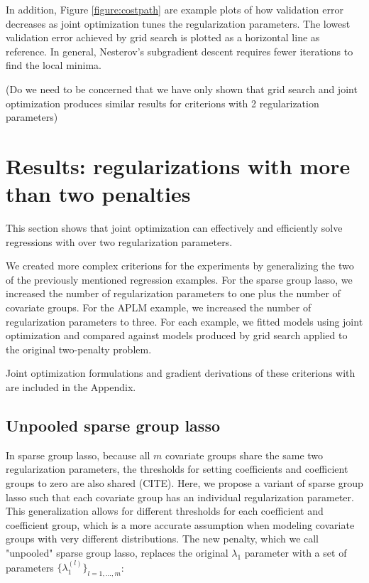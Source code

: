 \documentclass[10pt,letterpaper]{article}
\begin{document}
In addition, Figure \ref{figure:costpath} are example plots of how validation error decreases as joint optimization tunes the regularization parameters. The lowest validation error achieved by grid search is plotted as a horizontal line as reference. In general, Nesterov's subgradient descent requires fewer iterations to find the local minima.

(Do we need to be concerned that we have only shown that grid search and joint optimization produces similar results for criterions with 2 regularization parameters)

\section{Results: regularizations with more than two penalties}

This section shows that joint optimization can effectively and efficiently solve regressions with over two regularization parameters.

We created more complex criterions for the experiments by generalizing the two of the previously mentioned regression examples. For the sparse group lasso, we increased the number of regularization parameters to one plus the number of covariate groups. For the APLM example, we increased the number of regularization parameters to three. For each example, we fitted models using joint optimization and compared against models produced by grid search applied to the original two-penalty problem.

Joint optimization formulations and gradient derivations of these criterions with  are included in the Appendix.

\subsection{Unpooled sparse group lasso}

In sparse group lasso, because all $m$ covariate groups share the same two regularization parameters, the thresholds for setting coefficients and coefficient groups to zero are also shared (CITE). Here, we propose a variant of sparse group lasso such that each covariate group has an individual regularization parameter. This generalization allows for different thresholds for each coefficient and coefficient group, which is a more accurate assumption when modeling covariate groups with very different distributions. The new penalty, which we call "unpooled" sparse group lasso, replaces the original $\lambda_1$ parameter with a set of parameters $\{\lambda_1^{(l)}\}_{l=1,...,m}$:
\end{document}
